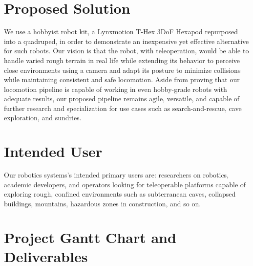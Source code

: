 \section{Proposed Solution}

We use a hobbyist robot kit, a Lynxmotion T-Hex 3DoF Hexapod repurposed into a quadruped, in order to demonstrate an inexpensive yet effective alternative for such robots. Our vision is that the robot, with teleoperation, would be able to handle varied rough terrain in real life while extending its behavior to perceive close environments using a camera and adapt its posture to minimize collisions while maintaining consistent and safe locomotion. Aside from proving that our locomotion pipeline is capable of working in even hobby-grade robots with adequate results, our proposed pipeline remains agile, versatile, and capable of further research and specialization for use cases such as search-and-rescue, cave exploration, and sundries.

\section{Intended User}

Our robotics systems's intended primary users are: researchers on robotics, academic developers, and operators looking for teleoperable platforms capable of exploring rough, confined environments such as subterranean caves, collapsed buildings, mountains, hazardous zones in construction, and so on.

\section{Project Gantt Chart and Deliverables}



